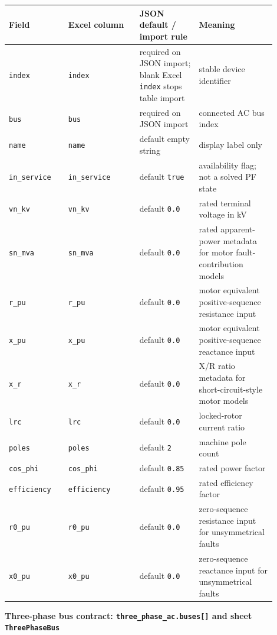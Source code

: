 \begin{longtable}{L{0.20\linewidth}L{0.24\linewidth}L{0.20\linewidth}L{0.26\linewidth}}
\toprule
Field & Excel column & JSON default / import rule & Meaning \\
\midrule
\endhead
\texttt{index} & \texttt{index} & required on JSON import; blank Excel \texttt{index} stops table import & stable device identifier \\
\texttt{bus} & \texttt{bus} & required on JSON import & connected AC bus index \\
\texttt{name} & \texttt{name} & default empty string & display label only \\
\texttt{in\_service} & \texttt{in\_service} & default \texttt{true} & availability flag; not a solved PF state \\
\texttt{vn\_kv} & \texttt{vn\_kv} & default \texttt{0.0} & rated terminal voltage in kV \\
\texttt{sn\_mva} & \texttt{sn\_mva} & default \texttt{0.0} & rated apparent-power metadata for motor fault-contribution models \\
\texttt{r\_pu} & \texttt{r\_pu} & default \texttt{0.0} & motor equivalent positive-sequence resistance input \\
\texttt{x\_pu} & \texttt{x\_pu} & default \texttt{0.0} & motor equivalent positive-sequence reactance input \\
\texttt{x\_r} & \texttt{x\_r} & default \texttt{0.0} & X/R ratio metadata for short-circuit-style motor models \\
\texttt{lrc} & \texttt{lrc} & default \texttt{0.0} & locked-rotor current ratio \\
\texttt{poles} & \texttt{poles} & default \texttt{2} & machine pole count \\
\texttt{cos\_phi} & \texttt{cos\_phi} & default \texttt{0.85} & rated power factor \\
\texttt{efficiency} & \texttt{efficiency} & default \texttt{0.95} & rated efficiency factor \\
\texttt{r0\_pu} & \texttt{r0\_pu} & default \texttt{0.0} & zero-sequence resistance input for unsymmetrical faults \\
\texttt{x0\_pu} & \texttt{x0\_pu} & default \texttt{0.0} & zero-sequence reactance input for unsymmetrical faults \\
\bottomrule
\end{longtable}

\noindent\textbf{Three-phase bus contract: \texttt{three\_phase\_ac.buses[]} and sheet \texttt{ThreePhaseBus}}

